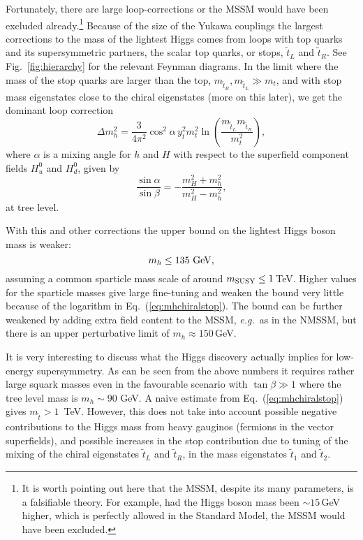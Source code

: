 \documentclass[notes.tex]{subfiles}
\begin{document}
Fortunately, there are large loop-corrections or the MSSM would have been excluded already.\footnote{It is worth pointing out here that the MSSM, despite its many parameters, is a falsifiable theory. For example, had the Higgs boson mass been $\sim15$\,GeV higher, which is perfectly allowed in the Standard Model, the MSSM would have been excluded.} Because of the size of the Yukawa couplings the largest corrections to the mass of the lightest Higgs comes from loops with top quarks and its supersymmetric partners, the scalar top quarks, or stops, $\tilde t_L$ and $\tilde t_R$. See Fig.~\ref{fig:hierarchy} for the relevant Feynman diagrams. In the limit where the mass of the stop quarks are larger than the top, $m_{\tilde{t}_R},m_{\tilde{t}_L}\gg m_t $, and with stop mass eigenstates close to the chiral eigenstates (more on this later), we get the dominant loop correction
\begin{equation}
\Delta m_h^2 = \frac{3}{4\pi^2} \cos^2\alpha\, y_t^2 m_t^2 \ln\left(\frac{m_{\tilde{t}_L}m_{\tilde{t}_R}}{m_t^2}\right),\label{eq:mhchiralstop}
\end{equation}
where $\alpha$ is a mixing angle for $h$ and $H$ with respect to the superfield component fields $H_u^0$ and $H_d^0$, given by
\begin{equation}
\frac{\sin\alpha}{\sin\beta}=-\frac{m_H^2+m_h^2}{m_H^2-m_h^2},
\end{equation}
at tree level.

With this and other corrections the upper bound on the lightest Higgs boson mass is weaker:
\[m_h \leq 135~{\rm GeV},\]
assuming a common sparticle mass scale of around $m_{\rm SUSY} \leq 1$\,TeV. Higher values for the sparticle masses give large fine-tuning and weaken the bound very little because of the logarithm in Eq.~(\ref{eq:mhchiralstop}). The bound can be further weakened by adding extra field content to the MSSM, {\it e.g.}\ as in the NMSSM, but there is an upper perturbative limit of $m_h \approx 150$\,GeV.

It is very interesting to discuss what the Higgs discovery actually implies for low-energy supersymmetry. As can be seen from the above numbers it requires rather large squark masses even in the favourable scenario with $\tan\beta\gg 1$ where the tree level mass is $m_h\sim 90$ GeV. A naive estimate from Eq.~(\ref{eq:mhchiralstop}) gives $m_{\tilde t}> 1$\, TeV. However, this does not take into account possible negative contributions to the Higgs mass from heavy gauginos (fermions in the vector superfields), and possible increases in the stop contribution due to tuning of the mixing of the chiral eigenstates $\tilde t_L$ and $\tilde t_R$, in the mass eigenstates $\tilde t_1$ and $\tilde t_2$.
\end{document}
